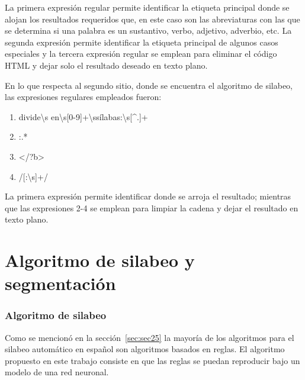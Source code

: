 La primera expresión regular permite identificar la etiqueta principal donde se alojan los resultados requeridos que, en este caso son las abreviaturas con las que se determina si una palabra es un sustantivo, verbo, adjetivo, adverbio, etc. La segunda expresión permite identificar la etiqueta principal de algunos casos especiales y la tercera expresión regular se emplean para eliminar el código HTML y dejar solo el resultado deseado en texto plano.

En lo que respecta al segundo sitio, donde se encuentra el algoritmo de silabeo, las expresiones regulares empleados fueron:

\begin{enumerate}
	\item divide\textbackslash s en\textbackslash s[0-9]+\textbackslash ssílabas:\textbackslash s[\textasciicircum.]+
	
	\item :.*
	
	\item \textless/?b\textgreater
	
	\item /[:\textbackslash s]+/
\end{enumerate}

La primera expresión permite identificar donde se arroja el resultado; mientras que las expresiones 2-4 se emplean para limpiar la cadena y dejar el resultado en texto plano.

\section{Algoritmo de silabeo y segmentación}
\label{sec:sec33}

\subsubsection{Algoritmo de silabeo}

Como se mencionó en la sección~\ref{sec:sec25} la mayoría de los algoritmos para el silabeo automático en español son algoritmos basados en reglas. El algoritmo propuesto en este trabajo consiste en que las reglas se puedan reproducir bajo un modelo de una red neuronal.

